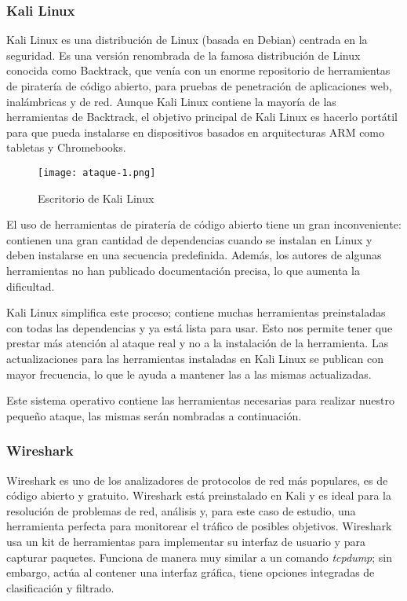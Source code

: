 
\subsubsection*{Kali Linux}
Kali Linux es una distribución de Linux (basada en Debian) centrada en la seguridad. 
Es una versión renombrada de la famosa distribución de Linux conocida como Backtrack, 
que venía con un enorme repositorio de herramientas de piratería de código abierto, 
para pruebas de penetración de aplicaciones web, inalámbricas y de red. Aunque Kali 
Linux contiene la mayoría de las herramientas de Backtrack, el objetivo principal 
de Kali Linux es hacerlo portátil para que pueda instalarse en dispositivos basados 
en arquitecturas ARM como tabletas y Chromebooks.

\begin{center}
    \begin{figure}   
       \begin{center}
          \texttt{[image: ataque-1.png]}
       \end{center}
       \caption{Escritorio de Kali Linux}
    \end{figure}
 \end{center}
 

El uso de herramientas de piratería de código abierto tiene un gran inconveniente: 
contienen una gran cantidad de dependencias cuando se instalan en Linux y deben 
instalarse en una secuencia predefinida. Además, los autores de algunas herramientas 
no han publicado documentación precisa, lo que aumenta la dificultad.

Kali Linux simplifica este proceso; contiene muchas herramientas preinstaladas con 
todas las dependencias y ya está lista para usar. Esto nos permite tener que prestar 
más atención al ataque real y no a la instalación de la herramienta. Las actualizaciones 
para las herramientas instaladas en Kali Linux se publican con mayor frecuencia, 
lo que le ayuda a mantener las a las mismas actualizadas.

Este sistema operativo contiene las herramientas necesarias para realizar nuestro
pequeño ataque, las mismas serán nombradas a continuación.

\subsubsection*{Wireshark}
Wireshark es uno de los analizadores de protocolos de red más populares, es de 
código abierto y gratuito. Wireshark está preinstalado en Kali y es ideal para la 
resolución de problemas de red, análisis y, para este caso de estudio, una herramienta 
perfecta para monitorear el tráfico de posibles objetivos. Wireshark usa un kit de 
herramientas para implementar su interfaz de usuario y para capturar paquetes. 
Funciona de manera muy similar a un comando \emph{tcpdump}; sin embargo, actúa al contener 
una interfaz gráfica, tiene opciones integradas de clasificación y filtrado.

